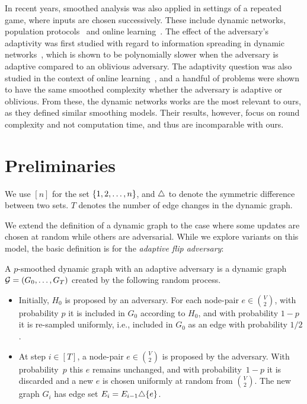 \documentclass[letter,11pt]{article}
\begin{document}
In recent years, smoothed analysis was also applied in settings of a repeated game, where inputs are chosen successively.
These include dynamic networks, population protocols~\cite{SS21} and online learning~\cite{HRS20,HRS21}.
The effect of the adversary's adaptivity was first studied with regard to information spreading in dynamic networks~\cite{MPS20},
which is shown to be polynomially slower when the adversary is adaptive compared to an oblivious adversary.
The adaptivity question was also studied in the context of online learning~\cite{HRS21}, and a handful of problems were shown to have the same smoothed complexity whether the adversary is adaptive or oblivious.
From these, the dynamic networks works are the most relevant to ours, as they defined similar smoothing models. 
Their results, however, focus on round complexity and not computation time, and thus are incomparable with ours.

\section{Preliminaries}
\label{sec:prelim}
We use $[n]$ for the set $\{1,2,\dots,n\}$, and $\triangle$ to denote the symmetric difference between two sets. $T$ denotes the number of edge changes in the dynamic graph.

We extend the definition of a dynamic graph to the case where some updates are chosen at random while others are adversarial. While we explore variants on this model, the basic definition is for the \emph{adaptive flip adversary}:

\begin{definition}
    A $p$-smoothed dynamic graph with an adaptive adversary is a dynamic graph $\mathcal{G} = (G_0,\dots,G_T)$ created by the following random process.
    \begin{itemize}
        \item Initially, $H_0$ is proposed by an adversary. 
        For each node-pair $e\in \binom{V}{2}$, 
        with probability $p$ it is included in $G_0$ according to $H_0$, and
        with probability $1-p$ it is re-sampled uniformly, i.e., included in $G_0$ as an edge with probability $1/2$.
        
        \item At step $i\in [T]$,
        a node-pair $e\in \binom{V}{2}$
        is proposed by the adversary.
        With probability~$p$ this $e$ remains unchanged, and with probability~$1-p$ it is discarded and a new  $e$ is chosen uniformly at random from $\binom{V}{2}$.
        The new graph $G_i$ has edge set $E_i = E_{i-1} \triangle \{e\}$.
    \end{itemize}
\end{definition}
\end{document}
